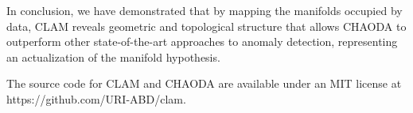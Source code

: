 In conclusion, we have demonstrated that by mapping the manifolds occupied by data, CLAM reveals geometric and topological structure that allows CHAODA to outperform other state-of-the-art approaches to anomaly detection, representing an actualization of the manifold hypothesis.

The source code for CLAM and CHAODA are available under an MIT license at https://github.com/URI-ABD/clam.
